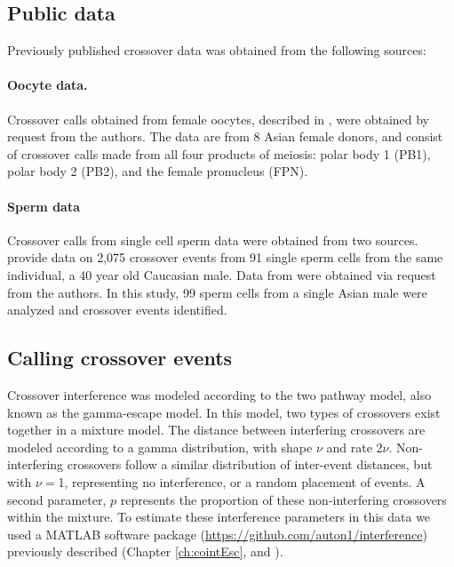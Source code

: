 \subsection{Public data}
Previously published crossover data was obtained from the following sources:

\paragraph{Oocyte data.}
Crossover calls obtained from female oocytes, described in \citet{Hou2013}, were obtained by request from the authors.
The data are from 8 Asian female donors, and consist of crossover calls made from all four products of meiosis: polar body 1 (PB1), polar body 2 (PB2), and the female pronucleus (FPN).

\paragraph{Sperm data}
Crossover calls from single cell sperm data were obtained from two sources.
%
\citet{Wang2012} provide data on 2,075 crossover events from 91 single sperm cells from the same individual, a 40 year old Caucasian male.
%
Data from \citet{Lu2012} were obtained via request from the authors.
In this study, 99 sperm cells from a single Asian male were analyzed and crossover events identified.

\subsection{Calling crossover events}
Crossover interference was modeled according to the two pathway model, also known as the gamma-escape model.
In this model, two types of crossovers exist together in a mixture model.
The distance between interfering crossovers are modeled according to a gamma distribution, with shape $\nu$ and rate 2$\nu$.
Non-interfering crossovers follow a similar distribution of inter-event distances, but with $\nu=$1, representing no interference, or a random placement of events.
A second parameter, $p$ represents the proportion of these non-interfering crossovers within the mixture.
To estimate these interference parameters in this data we used a MATLAB software package (\url{https://github.com/auton1/interference}) previously described (Chapter \ref{ch:cointEsc}, and \citet{Campbell2015}).


